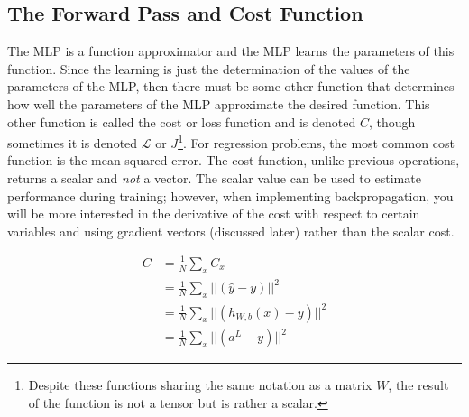 \documentclass{article}
\begin{document}

\subsection{The Forward Pass and Cost Function}

\quad The MLP is a function approximator and the MLP learns the parameters of
this function. Since the learning is just the determination of the values of the
parameters of the MLP, then there must be some other function that determines
how well the parameters of the MLP approximate the desired function. This other
function is called the cost or loss function and is denoted $C$, though sometimes
it is denoted $\mathcal{L}$ or $J$\footnote{Despite these functions sharing the same notation as
	a matrix $W$, the result of the function is not a tensor but is rather a scalar.}.
For regression problems, the most common
cost function is the mean squared error. The cost function, unlike previous
operations, returns a scalar and \textit{not} a vector. The scalar value can be used to estimate
performance during training; however, when implementing backpropagation, you will
be more interested in the derivative of the cost with respect to certain variables
and using gradient vectors (discussed later) rather than the scalar cost.

\begin{equation}
	\begin{aligned}
		C & = \frac{1}{N} \sum_{x} {C_x}                       \\
		  & = \frac{1}{N} \sum_{x} {||(\hat{y} - y)||^{2} }    \\
		  & = \frac{1}{N} \sum_{x} {||(h_{W,b}(x) - y)||^{2} } \\
		  & = \frac{1}{N} \sum_{x} {||(a^{L} - y)||^{2} }
	\end{aligned}
\end{equation}
\end{document}
